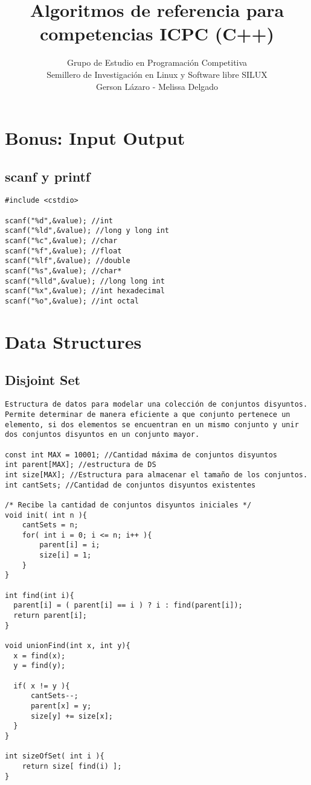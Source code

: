 \documentclass[10pt,letterpaper,twocolumn,twosided]{article}
\begin{document}
\title{Algoritmos de referencia para competencias ICPC (C++)}
\author{Grupo de Estudio en Programación Competitiva \\ Semillero de Investigación en Linux y Software libre SILUX \\ Gerson Lázaro - Melissa Delgado}
\maketitle
\tableofcontents
{}


\section{Bonus: Input Output}

\subsection{scanf y printf}
\begin{lstlisting}
#include <cstdio>

scanf("%d",&value); //int
scanf("%ld",&value); //long y long int
scanf("%c",&value); //char 
scanf("%f",&value); //float
scanf("%lf",&value); //double
scanf("%s",&value); //char*
scanf("%lld",&value); //long long int
scanf("%x",&value); //int hexadecimal
scanf("%o",&value); //int octal
\end{lstlisting}

\section{Data Structures}

\subsection{Disjoint Set}
\begin{lstlisting}
Estructura de datos para modelar una colección de conjuntos disyuntos. Permite determinar de manera eficiente a que conjunto pertenece un elemento, si dos elementos se encuentran en un mismo conjunto y unir dos conjuntos disyuntos en un conjunto mayor.

const int MAX = 10001; //Cantidad máxima de conjuntos disyuntos
int parent[MAX]; //estructura de DS
int size[MAX]; //Estructura para almacenar el tamaño de los conjuntos.
int cantSets; //Cantidad de conjuntos disyuntos existentes

/* Recibe la cantidad de conjuntos disyuntos iniciales */
void init( int n ){
    cantSets = n;
    for( int i = 0; i <= n; i++ ){
        parent[i] = i;
        size[i] = 1;
    }
}

int find(int i){
  parent[i] = ( parent[i] == i ) ? i : find(parent[i]);
  return parent[i];
}

void unionFind(int x, int y){
  x = find(x);
  y = find(y);

  if( x != y ){
      cantSets--;
      parent[x] = y;
      size[y] += size[x];
  }
}

int sizeOfSet( int i ){
    return size[ find(i) ];
}\end{lstlisting}
\end{document}
